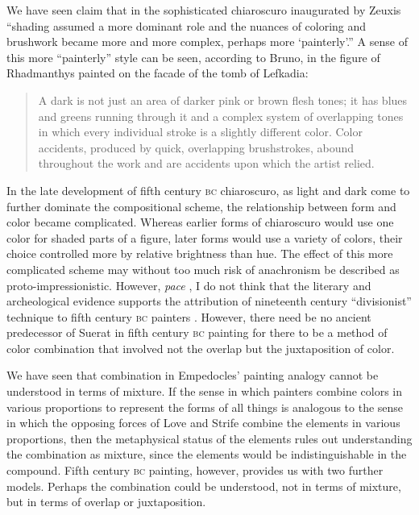 We have seen \citet[29]{Bruno:1977fk} claim that in the sophisticated chiaroscuro inaugurated by Zeuxis ``shading assumed a more dominant role and the nuances of coloring and brushwork became more and more complex, perhaps more `painterly'.'' A sense of this more ``painterly'' style can be seen, according to Bruno, in the figure of Rhadmanthys painted on the facade of the tomb of Lefkadia:
\begin{quote}
    A dark is not just an area of darker pink or brown flesh tones; it has blues and greens running through it and a complex system of overlapping tones in which every individual stroke is a slightly different color. Color accidents, produced by quick, overlapping brushstrokes, abound throughout the work and are accidents upon which the artist relied. \citep[25]{Bruno:1977fk}
\end{quote}
In the late development of fifth century \textsc{bc} chiaroscuro, as light and dark come to further dominate the compositional scheme, the relationship between form and color became complicated. Whereas earlier forms of chiaroscuro would use one color for shaded parts of a figure, later forms would use a variety of colors, their choice controlled more by relative brightness than hue. The effect of this more complicated scheme may without too much risk of anachronism be described as proto-impressionistic. However, \emph{pace} \citet{Keuls:1975uq}, I do not think that the literary and archeological evidence supports the attribution of nineteenth century ``divisionist'' technique to fifth century \textsc{bc} painters \citep[see][]{Pemberton:1976kx}. However, there need be no ancient predecessor of Suerat in fifth century \textsc{bc} painting for there to be a method of color combination that involved not the overlap but the juxtaposition of color.

We have seen that combination in Empedocles' painting analogy cannot be understood in terms of mixture. If the sense in which painters combine colors in various proportions to represent the forms of all things is analogous to the sense in which the opposing forces of Love and Strife combine the elements in various proportions, then the metaphysical status of the elements rules out understanding the combination as mixture, since the elements would be indistinguishable in the compound. Fifth century \textsc{bc} painting, however, provides us with two further models. Perhaps the combination could be understood, not in terms of mixture, but in terms of overlap or juxtaposition. 

